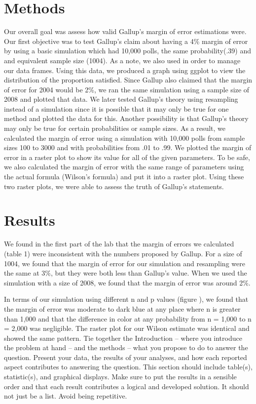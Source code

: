 \documentclass{article}\usepackage[]{graphicx}\usepackage[]{xcolor}
\begin{document}
\begin{multicols}{2}
\section{Methods}
Our overall goal was assess how valid Gallup's margin of error estimations were. Our first objective was to test Gallup's claim about having a 4\% margin of error by using a basic simulation which had 10,000 polls, the same probability(.39) and and equivalent sample size (1004). As a note, we also used \citep{tidyverse} in order to manage our data frames. Using this data, we produced a graph using ggplot \citep{ggplot2} to view the distribution of the proportion satisfied. Since Gallup also claimed that the margin of error for 2004 would be 2\%, we ran the same simulation using a sample size of 2008 and plotted that data. We later tested Gallup's theory using resampling instead of a simulation since it is possible that it may only be true for one method and plotted the data for this. Another possibility is that Gallup's theory may only be true for certain probabilities or sample sizes. As a result, we calculated the margin of error using a simulation with 10,000 polls from sample sizes 100 to 3000 and with probabilities from .01 to .99. We plotted the margin of error in a raster plot to show its value for all of the given parameters. To be safe, we also calculated the margin of error with the same range of parameters using the actual formula (Wilson's formula) and put it into a raster plot. Using these two raster plots, we were able to assess the truth of Gallup's statements. 

\section{Results}
We found in the first part of the lab that the margin of errors we calculated (table 1) were inconsistent with the numbers proposed by Gallup. For a size of 1004, we found that the margin of error for our simulation and resampling were the same at 3\%, but they were both less than Gallup's value. When we used the simulation with a size of 2008, we found that the margin of error was around 2\%. 

In terms of our simulation using different n and p values (figure ), we found that the margin of error was moderate to dark blue at any place where n is greater than 1,000 and that the difference in color at any probability from n = 1,000 to n = 2,000 was negligible. The raster plot for our Wilson estimate was identical and showed the same pattern. 
Tie together the Introduction -- where you introduce the problem at hand -- and the methods --  what you propose to do to answer the question. Present your data, the results of your analyses, and how each reported aspect contributes to answering the question. This section should include table(s), statistic(s), and graphical displays. Make sure to put the results in a sensible order and that each result contributes a logical and developed solution. It should not just be a list. Avoid being repetitive. 


\end{multicols}
\end{document}
